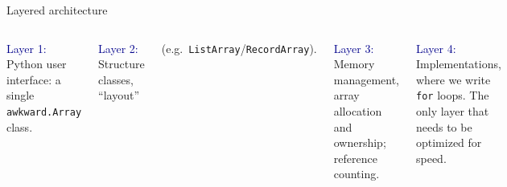\documentclass[aspectratio=169]{beamer}
\begin{document}
\begin{frame}{Layered architecture}
\large
\vspace{0.5 cm}
\begin{columns}
\vspace{-0.2 cm}

\textcolor{darkblue}{Layer 1:} Python user interface: a single \texttt{awkward.Array} class.
\vspace{\baselineskip}

\vspace{0.18 cm}
\textcolor{darkblue}{Layer 2:} Structure classes, ``layout''

(e.g.\ \texttt{ListArray}/\texttt{RecordArray}).
\vspace{\baselineskip}

\vspace{0.18 cm}
\textcolor{darkblue}{Layer 3:} Memory management, array allocation and ownership; reference counting.
\vspace{\baselineskip}

\vspace{0.18 cm}
\textcolor{darkblue}{Layer 4:} Implementations, where we write \texttt{for} loops. The only layer that needs to be optimized for speed.

\includegraphics[width=\linewidth]{awkward-1-0-layers.pdf}
\end{columns}
\end{frame}
\end{document}
